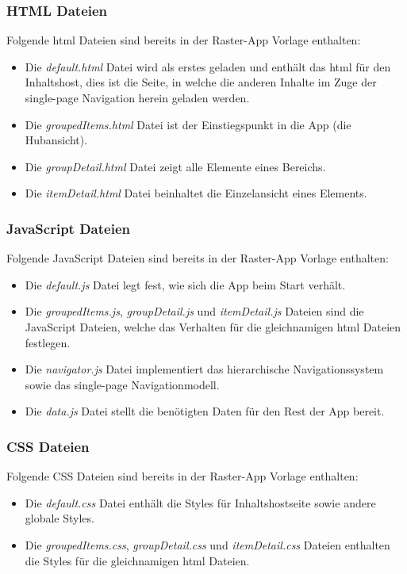 \documentclass[12pt,a4paper,bibtotoc,abstracton]{scrartcl}
\begin{document}
\subsubsection{HTML Dateien}
\label{subsubsec:htmldateien} 
Folgende \ac{html} Dateien sind bereits in der Raster-App Vorlage enthalten:
\begin{itemize}
	\item Die \textit{default.html} Datei wird als erstes geladen und enthält das \ac{html} für den Inhaltshost, dies ist die Seite, in welche die anderen Inhalte im Zuge der single-page Navigation herein geladen werden.
	\item Die \textit{groupedItems.html} Datei ist der Einstiegspunkt in die App (die Hubansicht).
	\item Die \textit{groupDetail.html} Datei zeigt alle Elemente eines Bereichs.
	\item Die \textit{itemDetail.html} Datei beinhaltet die Einzelansicht eines Elements.
\end{itemize}

\subsubsection{JavaScript Dateien}
\label{subsubsec:javascriptdateien} 
Folgende JavaScript Dateien sind bereits in der Raster-App Vorlage enthalten:
\begin{itemize}
	\item Die \textit{default.js} Datei legt fest, wie sich die App beim Start verhält.
	\item Die \textit{groupedItems.js}, \textit{groupDetail.js} und \textit{itemDetail.js} Dateien sind die JavaScript Dateien, welche das Verhalten für die gleichnamigen \ac{html} Dateien festlegen.
	\item Die \textit{navigator.js} Datei implementiert das hierarchische Navigationssystem sowie das single-page Navigationmodell.
	\item Die \textit{data.js} Datei stellt die benötigten Daten für den Rest der App bereit.
\end{itemize}

\subsubsection{CSS Dateien}
\label{subsubsec:cssdateien} 
Folgende CSS Dateien sind bereits in der Raster-App Vorlage enthalten:
\begin{itemize}
	\item Die \textit{default.css} Datei enthält die Styles für Inhaltshostseite sowie andere globale Styles.
	\item Die \textit{groupedItems.css}, \textit{groupDetail.css} und \textit{itemDetail.css} Dateien enthalten die Styles für die gleichnamigen \ac{html} Dateien.
\end{itemize}
\end{document}
